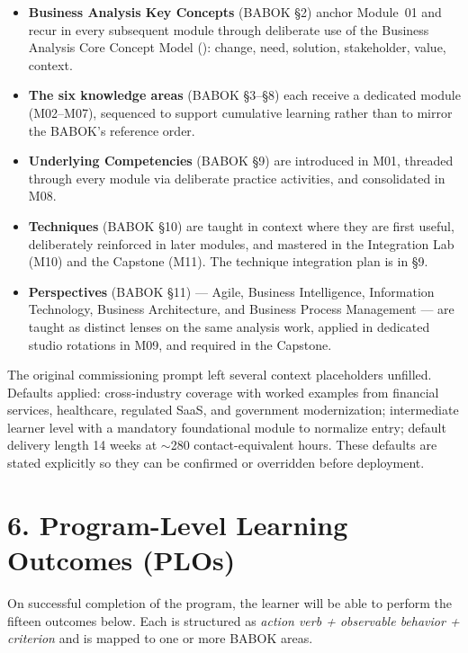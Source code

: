 \documentclass[11pt,letterpaper,oneside]{report}
\begin{document}
\begin{itemize}
  \item \textbf{Business Analysis Key Concepts} (BABOK \S2) anchor Module~01 and recur in every subsequent module through deliberate use of the Business Analysis Core Concept Model (): change, need, solution, stakeholder, value, context.
  \item \textbf{The six knowledge areas} (BABOK \S3--\S8) each receive a dedicated module (M02--M07), sequenced to support cumulative learning rather than to mirror the BABOK's reference order.
  \item \textbf{Underlying Competencies} (BABOK \S9) are introduced in M01, threaded through every module via deliberate practice activities, and consolidated in M08.
  \item \textbf{Techniques} (BABOK \S10) are taught in context where they are first useful, deliberately reinforced in later modules, and mastered in the Integration Lab (M10) and the Capstone (M11). The technique integration plan is in \S9.
  \item \textbf{Perspectives} (BABOK \S11) --- Agile, Business Intelligence, Information Technology, Business Architecture, and Business Process Management --- are taught as distinct lenses on the same analysis work, applied in dedicated studio rotations in M09, and required in the Capstone.
\end{itemize}

\begin{curriculumnote}
The original commissioning prompt left several context placeholders unfilled. Defaults applied: cross-industry coverage with worked examples from financial services, healthcare, regulated SaaS, and government modernization; intermediate learner level with a mandatory foundational module to normalize entry; default delivery length 14 weeks at ${\sim}$280 contact-equivalent hours. These defaults are stated explicitly so they can be confirmed or overridden before deployment.
\end{curriculumnote}


\section*{6. Program-Level Learning Outcomes (PLOs)}
On successful completion of the program, the learner will be able to perform the fifteen outcomes below. Each is structured as \emph{action verb + observable behavior + criterion} and is mapped to one or more BABOK areas.
\end{document}
